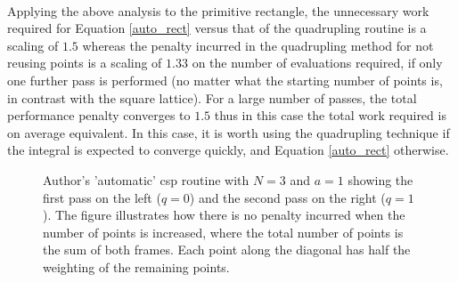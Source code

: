 \documentclass[a4paper, 12pt]{article}
\begin{document}
	\\\par Applying the above analysis to the primitive rectangle, the unnecessary work required for Equation \eqref{auto_rect} versus that of the quadrupling routine is a scaling of $1.5$ whereas the penalty incurred in the quadrupling method for not reusing points is a scaling of $1.33$ on the number of evaluations required, if only one further pass is performed (no matter what the starting number of points is, in contrast with the square lattice). For a large number of passes, the total performance penalty converges to $1.5$ thus in this case the total work required is on average equivalent. In this case, it is worth using the quadrupling technique if the integral is expected to converge quickly, and Equation \eqref{auto_rect} otherwise.
\pgfplotsset{width=3in}
\pgfplotsset{height=3in}
	\tikzset{external/export next=false}
\begin{figure}[H]
\caption{\footnotesize
	Author's 'automatic' \gls{csp} routine with $N = 3$ and $a=1$ showing the first pass on the left ($q=0$) and the second pass on the right ($q=1$). The figure illustrates how there is no penalty incurred when the number of points is increased, where the total number of points is the sum of both frames. Each point along the diagonal has half the weighting of the remaining points.}
\end{figure}
\end{document}

